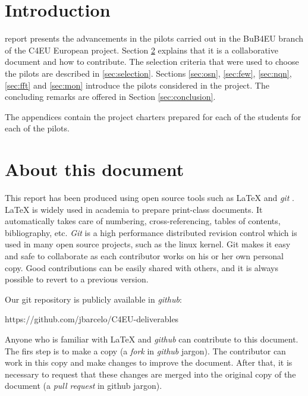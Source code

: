 \documentclass[draftclsnofoot,12pt,journal,onecolumn]{IEEEtran}
\begin{document}
\section{Introduction}
% 
% 
% 
% 
 report presents the advancements in the pilots carried out in the BuB4EU branch of the C4EU European project.
Section \ref{sec:about} explains that it is a collaborative document and how to contribute.
The selection criteria that were used to choose the pilots are described in \ref{sec:selection}.
Sections \ref{sec:osn}, \ref{sec:few}, \ref{sec:nqn}, \ref{sec:fft} and \ref{sec:mon} introduce the pilots considered in the project.
The concluding remarks are offered in Section \ref{sec:conclusion}.

The appendices contain the project charters prepared for each of the students for each of the pilots.

\section{About this document}
\label{sec:about}

This report has been produced using open source tools such as {\LaTeX} \cite{lamport1994ldp} and \emph{git} \cite{chacon2009pg}.
{\LaTeX} is widely used in academia to prepare print-class documents.
It automatically takes care of numbering, cross-referencing, tables of contents, bibliography, etc.
\emph{Git} is a high performance distributed revision control which is used in many open source projects, such as the linux kernel.
Git makes it easy and safe to collaborate as each contributor works on his or her own personal copy.
Good contributions can be easily shared with others, and it is always possible to revert to a previous version.

Our git repository is publicly available in \emph{github}:

https://github.com/jbarcelo/C4EU-deliverables

Anyone who is familiar with {\LaTeX} and \emph{github} can contribute to this document.
The firs step is to make a copy (a \emph{fork} in \emph{github} jargon).
The contributor can work in this copy and make changes to improve the document.
After that, it is necessary to request that these changes are merged into the original copy of the document (a \emph{pull request} in github jargon).
\end{document}
